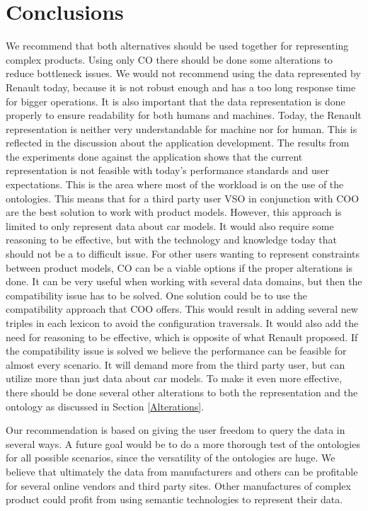 \documentclass{llncs}
\begin{document}
\section{Conclusions}

We recommend that both alternatives should be used together for
representing complex products. 
Using only CO there should be done some alterations to reduce
bottleneck issues. We would not recommend using the data represented
by Renault today, because it is not robust enough and has a too long
response time for bigger operations.  It is also important that the
data representation is done properly to ensure readability for both
humans and machines.  Today, the Renault representation is neither
very understandable for machine nor for human. This is reflected in
the discussion about the application development.  The results from
the experiments done against the application shows that the current
representation is not feasible with today's performance standards and
user expectations. This is the area where most of the workload is on
the use of the ontologies.  This means that for a third party user VSO
in conjunction with COO are the best solution to work with product
models. However, this approach is limited to only represent data about
car models. It would also require some reasoning to be effective, but
with the technology and knowledge today that should not be a to
difficult issue. For other users wanting to represent constraints
between product models, CO can be a viable options if the proper
alterations is done. It can be very useful when working with several
data domains, but then the compatibility issue has to be solved.  One
solution could be to use the compatibility approach that COO
offers. This would result in adding several new triples in each
lexicon to avoid the configuration traversals.  It would also add the
need for reasoning to be effective, which is opposite of what Renault
proposed. If the compatibility issue is solved we believe the
performance can be feasible for almost every scenario. It will demand
more from the third party user, but can utilize more than just data
about car models. To make it even more effective, there should be done
several other alterations to both the representation and the ontology
as discussed in Section \ref{Alterations}.

Our recommendation is based on giving the user freedom to query the
data in several ways.  A future goal would be to do a more thorough
test of the ontologies for all possible scenarios, since the
versatility of the ontologies are huge. We believe that ultimately the
data from manufacturers and others can be profitable for several
online vendors and third party sites. Other manufactures of complex
product could profit from using semantic
technologies to represent their data.
\end{document}
